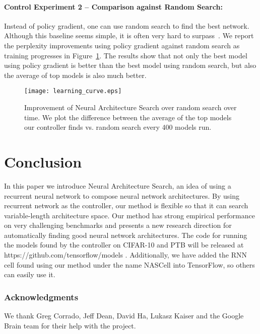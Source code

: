 \documentclass{article} \usepackage{iclr2017_conference,times}
\begin{document}
\paragraph{Control Experiment 2 -- Comparison against Random Search:} Instead of policy gradient, one can use random search to find the best network. Although this baseline seems simple, it is often very hard to surpass~\citep{bergstra2012random}. We report the perplexity improvements using policy gradient against random search as training progresses in Figure~\ref{fig:learning_curve}. The results show that not only the best model using policy gradient is better than the best model using random search, but also the average of top models is also much better.

\begin{figure}[h!]
\begin{center}
  \texttt{[image: learning\_curve.eps]}
\caption{Improvement of Neural Architecture Search over random search over time. We plot the difference between the average of the top  models our controller finds vs. random search every 400 models run.}
\label{fig:learning_curve}
\end{center}
\end{figure}














\section{Conclusion}

In this paper we introduce Neural Architecture Search, an idea of using a recurrent neural network to compose neural network architectures. By using recurrent network as the controller, our method is flexible so that it can search variable-length architecture space. Our method has strong empirical performance on very challenging benchmarks and presents a new research direction for automatically finding good neural network architectures. The code for running the models found by the controller on CIFAR-10 and PTB will be released at https://github.com/tensorflow/models . Additionally, we have added the RNN cell found using our method under the name NASCell into TensorFlow, so others can easily use it.

\subsubsection*{Acknowledgments}
We thank Greg Corrado, Jeff Dean, David Ha, Lukasz Kaiser and the Google Brain team for their help with the project.
\end{document}

